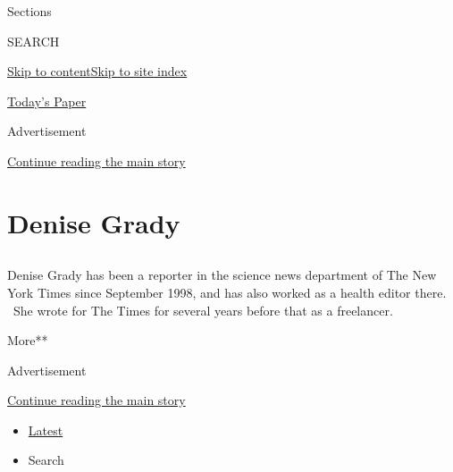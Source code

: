 Sections

SEARCH

\protect\hyperlink{site-content}{Skip to
content}\protect\hyperlink{site-index}{Skip to site index}

\href{https://myaccount.nytimes3xbfgragh.onion/auth/login?response_type=cookie\&client_id=vi}{}

\href{https://www.nytimes3xbfgragh.onion/section/todayspaper}{Today's
Paper}

Advertisement

\protect\hyperlink{after-top}{Continue reading the main story}

\hypertarget{denise-grady}{%
\section{Denise Grady}\label{denise-grady}}

\subsection{}

Denise Grady has been a reporter in the science news department of The
New York Times since September 1998, and has also worked as a health
editor there. ~She wrote for The Times for several years before that as
a freelancer.

More**

Advertisement

\protect\hyperlink{after-mid1}{Continue reading the main story}

\begin{itemize}
\tightlist
\item
  \protect\hyperlink{stream-panel}{Latest}
\item
  Search
\end{itemize}

